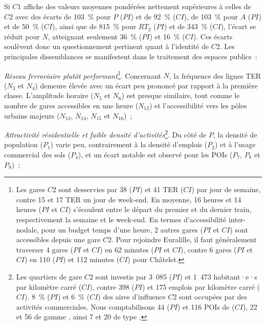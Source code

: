 \begin{refsegment}
Si \(C1\) affiche des valeurs moyennes pondérées nettement supérieures à celles de \(C2\) avec des écarts de 103~\% pour \(P\) (\(PI\)) et de 92~\% (\(CI\)), de 103~\% pour \(A\) (\(PI\)) et de 50~\% (\(CI\)), ainsi que de 815~\% pour \(RT_{2}\) (\(PI\)) et de 343~\% (\(CI\)), l’écart se réduit pour \(N\), atteignant seulement 36~\% (\(PI\)) et 16~\% (\(CI\)). Ces écarts soulèvent donc un questionnement pertinent quant à l’identité de \(C2\). Les principales dissemblances se manifestent dans le traitement des espaces publics~:
\begin{customitemize}
    \item \textsl{Réseau ferroviaire plutôt performant}\footnote{
        Les gares \(C2\) sont desservies par 38 (\(PI\)) et 41 \acrshort{TER} (\(CI\)) par jour de semaine, contre 15 et 17 \acrshort{TER} un jour de week-end. En moyenne, 16 heures et 14 heures (\(PI\) et \(CI\)) s'écoulent entre le départ du premier et du dernier train, respectivement la semaine et le week-end. En termes d'accessibilité inter-nodale, pour un budget temps d'une heure, 2 autres gares (\(PI\) et \(CI\)) sont accessibles depuis une gare \(C2\). Pour rejoindre Euralille, il faut généralement traverser 4 gares (\(PI\) et \(CI\)) en 62 minutes (\(PI\) et \(CI\)), contre 6 gares (\(PI\) et \(CI\)) en 110 (\(PI\)) et 112 minutes (\(CI\)) pour Châtelet.
    }. Concernant \(N\), la fréquence des lignes \acrshort{TER} (\(N_{3}\) et \(N_{4}\)) demeure élevée avec un écart peu prononcé par rapport à la première classe. L’amplitude horaire (\(N_{5}\) et \(N_{6}\)) est presque similaire, tout comme le nombre de gares accessibles en une heure (\(N_{12}\)) et l’accessibilité vers les pôles urbains majeurs (\(N_{13}\), \(N_{14}\), \(N_{15}\) et \(N_{16}\))~;
    \item \textsl{Attractivité résidentielle et faible densité d'activités}\footnote{
        Les quartiers de gare \(C2\) sont investis par 3~085 (\(PI\)) et 1~473 habitant·e·s par kilomètre carré (\(CI\)), contre 398 (\(PI\)) et 175 emplois par kilomètre carré (\(CI\)). 8~\% (\(PI\)) et 6~\% (\(CI\)) des aires d'influence \(C2\) sont occupées par des activités commerciales. Nous comptabilisons 44 (\(PI\)) et 116 \acrshort{POIs} de  (\(CI\)), 22 et 56 de gamme , ainsi 7 et 20 de type .
    }. Du côté de \(P\), la densité de population (\(P_{1}\)) varie peu, contrairement à la densité d’emplois (\(P_{2}\)) et à l'usage commercial des sols (\(P_{4}\)), et un écart notable est observé pour les \acrshort{POIs} (\(P_{7}\), \(P_{8}\) et \(P_{9}\))~;

\end{customitemize}
\end{refsegment}
